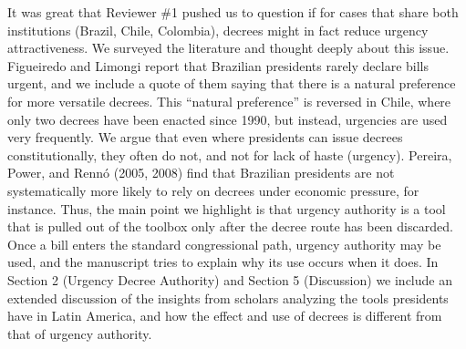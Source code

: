 \documentclass[article,letterpaper,times,12pt,listings-bw,microtype]{article}
\begin{document}
It was great that Reviewer \#1 pushed us to question if for cases that share  both institutions (Brazil, Chile, Colombia), decrees might in fact reduce urgency attractiveness. We surveyed the literature and thought deeply about this issue. Figueiredo and Limongi report that Brazilian presidents rarely declare bills urgent, and we include a quote of them saying that there is a natural preference for more versatile decrees. This ``natural preference'' is reversed in Chile, where only two decrees have been enacted since 1990, but instead, urgencies are used very frequently. We argue that even where presidents can issue decrees constitutionally, they often do not, and not for lack of haste (urgency). Pereira, Power, and Rennó (2005, 2008) find that Brazilian presidents are not systematically more likely to rely on decrees under economic pressure, for instance. Thus, the main point we highlight is that urgency authority is a tool that is pulled out of the toolbox only after the decree route has been discarded. Once a bill enters the standard congressional path, urgency authority may be used, and the manuscript tries to explain why its use occurs when it does. In Section 2 (Urgency Decree Authority) and Section 5 (Discussion) we include an extended discussion of the insights from scholars analyzing the tools presidents have in Latin America, and how the effect and use of decrees is different from that of urgency authority. 



 
\end{document}
